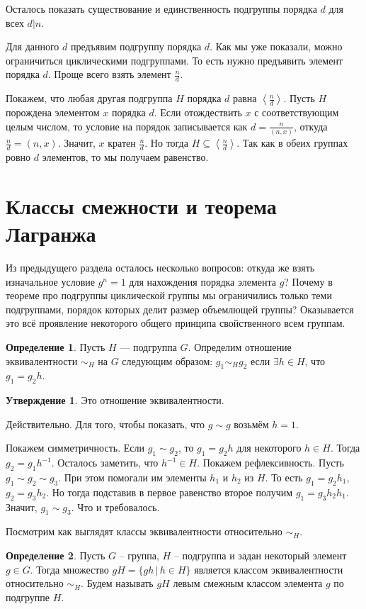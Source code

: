 \documentclass[10pt,a4paper,oneside]{book}
\theoremstyle{definition}
\newtheorem*{defn}{\color{yellow!30!red} Определение}
\newtheorem{utvr}{\color{blue!50!black}Утверждение}
\def\lan{\left\langle }
\def\ran{\right\rangle}
\def\dfn{\begin{defn}}
\def\edfn{\end{defn}}
\def\utv{\begin{utvr}}
\def\eutv{\end{utvr}}
\begin{document}
Осталось показать существование и единственность подгруппы порядка $d$ для всех $d|n$.

Для данного $d$ предъявим подгруппу порядка $d$. Как мы уже показали, можно ограничиться циклическими подгруппами. То есть нужно предъявить элемент порядка $d$. Проще всего взять элемент $\frac{n}{d}$.

Покажем, что любая другая подгруппа $H$ порядка $d$ равна $\lan \frac{n}{d} \ran$. Пусть $H$ порождена элементом $x$ порядка $d$. Если отождествить $x$ с соответствующим целым числом, то условие на порядок записывается как  $d=\frac{n}{(n,x)}$, откуда $\frac{n}{d}=(n,x)$. Значит, $x$ кратен $\frac{n}{d}$. Но тогда $H \subseteq \lan\frac{n}{d}\ran$. Так как в обеих группах ровно $d$ элементов, то мы получаем равенство.
\endproof




\section{Классы смежности и теорема Лагранжа}

Из предыдущего раздела осталось несколько вопросов: откуда же взять изначальное условие $g^n=1$ для нахождения порядка элемента $g$? Почему в теореме про подгруппы циклической группы мы ограничились только теми подгруппами, порядок которых делит размер объемлющей группы? Оказывается это всё проявление некоторого общего принципа свойственного всем группам.


\dfn Пусть $H$ --- подгруппа $G$. Определим отношение эквивалентности $\sim_H$ на $G$ следующим образом: $g_1\sim_H g_2$ если $\exists h \in H$, что $g_1=g_2 h$.
\edfn

\utv Это отношение эквивалентности.
\eutv
\proof Действительно. Для того, чтобы показать, что $g\sim g$ возьмём $h=1$. 

Покажем симметричность. Если $g_1 \sim g_2$, то $g_1=g_2h$ для некоторого $h\in H$. Тогда $g_2=g_1h^{-1}$. Осталось заметить, что $h^{-1}\in H$. Покажем рефлексивность. Пусть $g_1\sim g_2 
\sim g_3$. При этом помогали им элементы $h_1$ и $h_2$ из $H$. То есть $g_1=g_2h_1$, $g_2=g_3h_2$. Но тогда подставив в первое равенство второе получим $g_1=g_3h_2h_1$. Значит, $g_1\sim g_3$. Что и требовалось. 
\endproof

Посмотрим как выглядят классы эквивалентности относительно $\sim_H$.

\dfn Пусть $G$ -- группа, $H$ -- подгруппа и задан некоторый элемент $g\in G$. Тогда множество $gH=\{ gh\,|\, h \in H\}$ является классом эквивалентности относительно $\sim_H$. Будем называть $gH$ левым смежным  классом элемента $g$ по подгруппе $H$. 
\edfn
\end{document}
